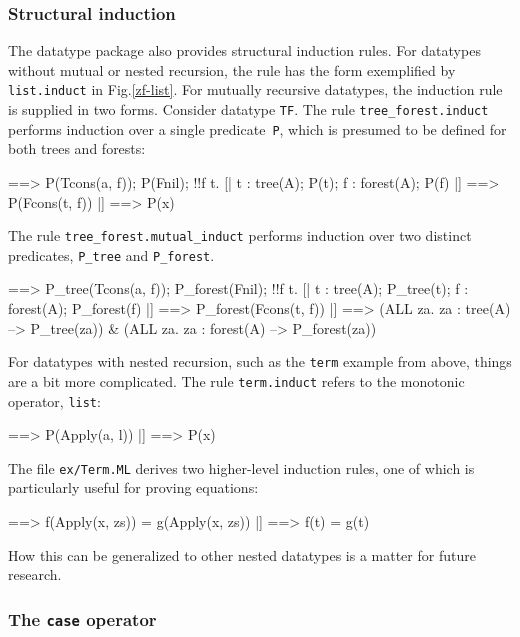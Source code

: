 \subsubsection{Structural induction}

The datatype package also provides structural induction rules.  For datatypes
without mutual or nested recursion, the rule has the form exemplified by
\texttt{list.induct} in Fig.\ts\ref{zf-list}.  For mutually recursive
datatypes, the induction rule is supplied in two forms.  Consider datatype
\texttt{TF}.  The rule \texttt{tree_forest.induct} performs induction over a
single predicate~\texttt{P}, which is presumed to be defined for both trees
and forests:
\begin{ttbox}
[| x : tree_forest(A);
   !!a f. [| a : A; f : forest(A); P(f) |] ==> P(Tcons(a, f)); P(Fnil);
   !!f t. [| t : tree(A); P(t); f : forest(A); P(f) |]
          ==> P(Fcons(t, f)) 
|] ==> P(x)
\end{ttbox}
The rule \texttt{tree_forest.mutual_induct} performs induction over two
distinct predicates, \texttt{P_tree} and \texttt{P_forest}.
\begin{ttbox}
[| !!a f.
      [| a : A; f : forest(A); P_forest(f) |] ==> P_tree(Tcons(a, f));
   P_forest(Fnil);
   !!f t. [| t : tree(A); P_tree(t); f : forest(A); P_forest(f) |]
          ==> P_forest(Fcons(t, f)) 
|] ==> (ALL za. za : tree(A) --> P_tree(za)) &
    (ALL za. za : forest(A) --> P_forest(za))
\end{ttbox}

For datatypes with nested recursion, such as the \texttt{term} example from
above, things are a bit more complicated.  The rule \texttt{term.induct}
refers to the monotonic operator, \texttt{list}:
\begin{ttbox}
[| x : term(A);
   !!a l. [| a : A; l : list(Collect(term(A), P)) |] ==> P(Apply(a, l)) 
|] ==> P(x)
\end{ttbox}
The file \texttt{ex/Term.ML} derives two higher-level induction rules, one of
which is particularly useful for proving equations:
\begin{ttbox}
[| t : term(A);
   !!x zs. [| x : A; zs : list(term(A)); map(f, zs) = map(g, zs) |]
           ==> f(Apply(x, zs)) = g(Apply(x, zs)) 
|] ==> f(t) = g(t)  
\end{ttbox}
How this can be generalized to other nested datatypes is a matter for future
research.


\subsubsection{The \texttt{case} operator}

